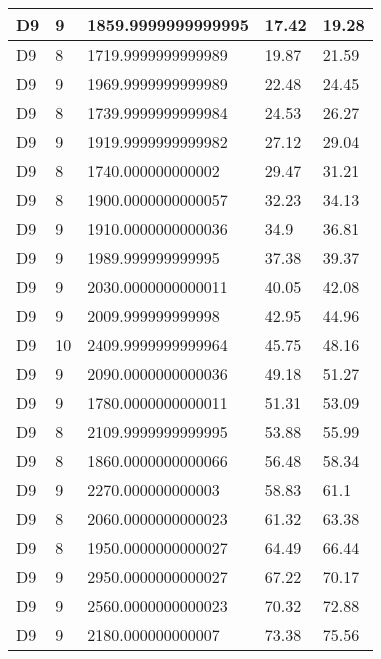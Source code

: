 \begin{longtable}{|l|l|l|l|l|}
D9 & 9 & 1859.9999999999995 & 17.42 & 19.28 \\ \hline
D9 & 8 & 1719.9999999999989 & 19.87 & 21.59 \\ \hline
D9 & 9 & 1969.9999999999989 & 22.48 & 24.45 \\ \hline
D9 & 8 & 1739.9999999999984 & 24.53 & 26.27 \\ \hline
D9 & 9 & 1919.9999999999982 & 27.12 & 29.04 \\ \hline
D9 & 8 & 1740.000000000002 & 29.47 & 31.21 \\ \hline
D9 & 8 & 1900.0000000000057 & 32.23 & 34.13 \\ \hline
D9 & 9 & 1910.0000000000036 & 34.9 & 36.81 \\ \hline
D9 & 9 & 1989.999999999995 & 37.38 & 39.37 \\ \hline
D9 & 9 & 2030.0000000000011 & 40.05 & 42.08 \\ \hline
D9 & 9 & 2009.999999999998 & 42.95 & 44.96 \\ \hline
D9 & 10 & 2409.9999999999964 & 45.75 & 48.16 \\ \hline
D9 & 9 & 2090.0000000000036 & 49.18 & 51.27 \\ \hline
D9 & 9 & 1780.0000000000011 & 51.31 & 53.09 \\ \hline
D9 & 8 & 2109.9999999999995 & 53.88 & 55.99 \\ \hline
D9 & 8 & 1860.0000000000066 & 56.48 & 58.34 \\ \hline
D9 & 9 & 2270.000000000003 & 58.83 & 61.1 \\ \hline
D9 & 8 & 2060.0000000000023 & 61.32 & 63.38 \\ \hline
D9 & 8 & 1950.0000000000027 & 64.49 & 66.44 \\ \hline
D9 & 9 & 2950.0000000000027 & 67.22 & 70.17 \\ \hline
D9 & 9 & 2560.0000000000023 & 70.32 & 72.88 \\ \hline
D9 & 9 & 2180.000000000007 & 73.38 & 75.56 \\ \hline
\end{longtable}
\pagebreak